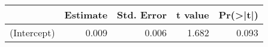 
\begin{tabular}{l|r|r|r|r}
\hline
  & Estimate & Std. Error & t value & Pr(>|t|)\\
\hline
(Intercept) & 0.009 & 0.006 & 1.682 & 0.093\\
\hline
\end{tabular}
